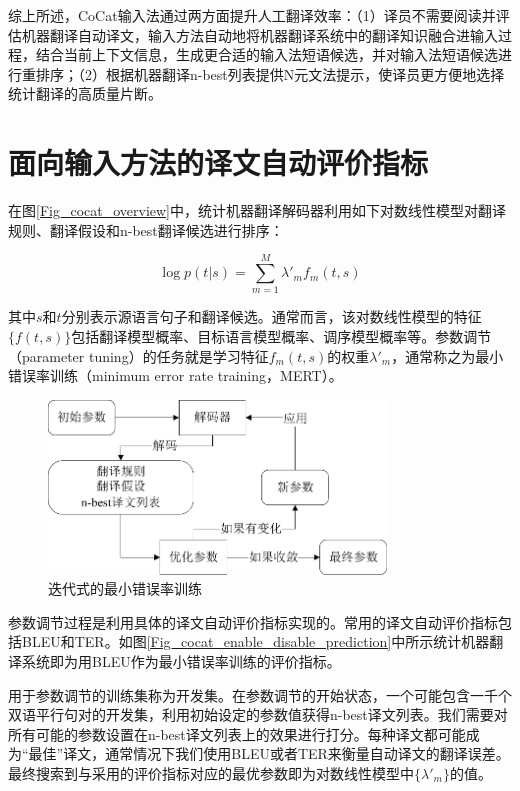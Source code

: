综上所述，CoCat输入法通过两方面提升人工翻译效率：（1）译员不需要阅读并评估机器翻译自动译文，输入方法自动地将机器翻译系统中的翻译知识融合进输入过程，结合当前上下文信息，生成更合适的输入法短语候选，并对输入法短语候选进行重排序；（2）根据机器翻译n-best列表提供N元文法提示，使译员更方便地选择统计翻译的高质量片断。

\section{面向输入方法的译文自动评价指标}

在图\ref{Fig_cocat_overview}中，统计机器翻译解码器利用如下对数线性模型对翻译规则、翻译假设和n-best翻译候选进行排序：

\begin{equation}
\log p(t|s)= \sum_{m=1}^{M}\lambda'_m f_m(t,s)
\end{equation}

其中$s$和$t$分别表示源语言句子和翻译候选。通常而言，该对数线性模型的特征$ \{f(t,s)\}$包括翻译模型概率、目标语言模型概率、调序模型概率等。参数调节（parameter tuning）的任务就是学习特征$f_m(t,s)$的权重$\lambda'_m$，通常称之为最小错误率训练（minimum error rate training，MERT）。

\begin{figure}[!btp]
	\centering
	\includegraphics[width=0.8\textwidth]{Figure/Figure_3_5.pdf}
	\caption{迭代式的最小错误率训练}
	\label{Fig_mert}
\end{figure}

参数调节过程是利用具体的译文自动评价指标实现的。常用的译文自动评价指标包括BLEU和TER。如图\ref{Fig_cocat_enable_disable_prediction}中所示统计机器翻译系统即为用BLEU作为最小错误率训练的评价指标。

用于参数调节的训练集称为开发集。在参数调节的开始状态，一个可能包含一千个双语平行句对的开发集，利用初始设定的参数值获得n-best译文列表。我们需要对所有可能的参数设置在n-best译文列表上的效果进行打分。每种译文都可能成为“最佳”译文，通常情况下我们使用BLEU或者TER来衡量自动译文的翻译误差。最终搜索到与采用的评价指标对应的最优参数即为对数线性模型中$\{\lambda'_m\}$的值。

